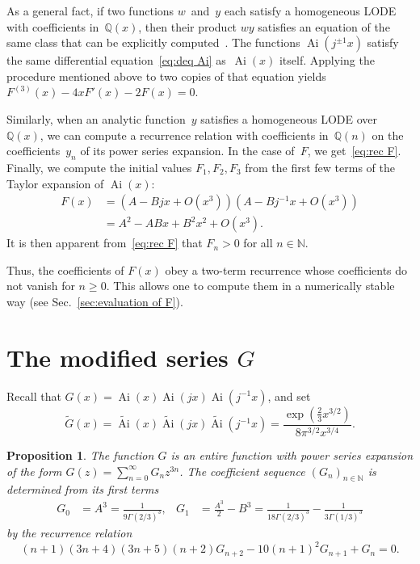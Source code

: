 \documentclass[10pt, conference]{IEEEtran}
\DeclareMathOperator{\Ai}{Ai}
\newtheorem{proposition}{Proposition}
\begin{document}
\begin{IEEEproof}
  As a general fact, if two functions $w$~and~$y$ each satisfy a
  homogeneous LODE with coefficients in~$\mathbb{Q}(x)$, then
  their product $wy$ satisfies an equation of the same class that can be explicitly computed~{\cite[Sec.~6.4]{Stanley1999}}.
The functions $\Ai(j^{\pm 1} x)$ satisfy the same
  differential equation~\eqref{eq:deq Ai} as~$\Ai(x)$
  itself. Applying the procedure mentioned above
  to two copies of that equation yields $F^{(3)}(x)
  - 4 xF'(x) - 2 F(x) = 0$.
  
  Similarly, when an analytic function~$y$ satisfies a homogeneous LODE
  over~$\mathbb{Q}(x)$, we can compute a recurrence relation with
  coefficients in~$\mathbb{Q}(n)$ on the coefficients~$y_n$ of its power
  series expansion.
  In the case of~$F$, we get~\eqref{eq:rec F}. Finally, we
  compute the initial values $F_1, F_2, F_3$ from the first few terms of the
  Taylor expansion of $\Ai(x)$:
  \begin{align*}
    F(x) &= (A-Bjx+O(x^3))(A-Bj^{-1}x+O(x^3))\\
         &= A^2-ABx+B^2x^2+O(x^3).
  \end{align*}
  It is then apparent from~\eqref{eq:rec F} that $F_n > 0$ for all $n \in
  \mathbb{N}$.
\end{IEEEproof}

Thus, the coefficients of $F(x)$ obey a two-term recurrence
whose coefficients do not vanish for $n \geq 0$. This allows one to
compute them in a numerically stable way (see Sec.~\ref{sec:evaluation of F}).




\section{The modified series $G$}
\label{sec:G}

Recall that $ G(x) = \Ai(x) \Ai(jx) \Ai(j^{- 1} x)$, and set
\begin{equation}
  \tilde{G}(x) = \widetilde{\Ai}(x) 
  \widetilde{\Ai}(jx)  \widetilde{\Ai}(j^{-
  1} x) = \frac{\exp(\frac{2}{3} x^{3 / 2})}{8 \pi^{3 /
  2} x^{3 / 4}} . \label{eq:asy G}
\end{equation}

\begin{proposition}
  \label{prop:rec G}
  The function $G$ is an entire function with power series
  expansion of the form $G(z) = \sum_{n = 0}^{\infty} G_n z^{3 n}$.
  The coefficient sequence $(G_n)_{n \in \mathbb{N}}$ is
  determined from its first terms
  \begin{align*}
    G_0 &= A^3={\frac{1}{9{\Gamma}(2/3)^3}}, &
G_1 &= {\frac{A^3}{2}}-B^3={\frac{1}{18{\Gamma}(2/3)^3}}-{\frac{1}{3{\Gamma}(1/3)^3}}
\end{align*}
  by the recurrence relation
  \begin{equation}
    \label{eq:rec G}
    (n+1)(3n+4)(3n+5)(n+2) G_{n + 2} - 10(n+1)^2  G_{n+1} + G_n = 0.
  \end{equation}
\end{proposition}
\end{document}

